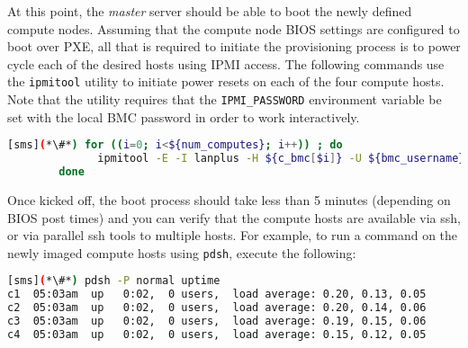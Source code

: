 At this point, the {\em master} server should be able to boot the newly defined
compute nodes. Assuming that the compute node BIOS settings are configured to
boot over PXE, all that is required to initiate the provisioning process is to
power cycle each of the desired hosts using IPMI access.
The following commands use the \texttt{ipmitool} utility to initiate power
resets on each of the four compute hosts. Note that the utility requires that
the \texttt{IPMI\_PASSWORD} environment variable be set with the local BMC password in
order to work interactively.

\begin{lstlisting}[language=bash,keywords={},upquote=true]
[sms](*\#*) for ((i=0; i<${num_computes}; i++)) ; do
              ipmitool -E -I lanplus -H ${c_bmc[$i]} -U ${bmc_username} chassis power reset
        done
\end{lstlisting} 

Once kicked off, the boot process should take less than 5 minutes (depending on
BIOS post times) and you can verify that the compute hosts are available via
ssh, or via parallel ssh tools to multiple hosts. For example, to run a command
on the newly imaged compute hosts using \texttt{pdsh}, execute the following:

  
\begin{lstlisting}[language=bash]
[sms](*\#*) pdsh -P normal uptime
c1  05:03am  up   0:02,  0 users,  load average: 0.20, 0.13, 0.05
c2  05:03am  up   0:02,  0 users,  load average: 0.20, 0.14, 0.06
c3  05:03am  up   0:02,  0 users,  load average: 0.19, 0.15, 0.06
c4  05:03am  up   0:02,  0 users,  load average: 0.15, 0.12, 0.05
\end{lstlisting}
